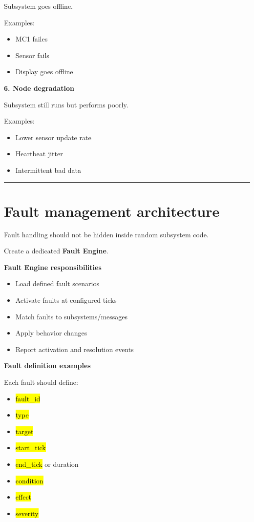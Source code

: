 \documentclass{report}
\begin{document}
Subsystem goes offline. 

Examples:
\begin{itemize}
   \item MC1 failes
   \item Sensor fails
   \item Display goes offline
\end{itemize}

\textbf{6. Node degradation}

Subsystem still runs but performs poorly. 

Examples:
\begin{itemize}
   \item Lower sensor update rate
   \item Heartbeat jitter
   \item Intermittent bad data
\end{itemize}


\begin{center}
\rule{0.9\textwidth}{1pt}
\end{center}
\section{Fault management architecture}

Fault handling should not be hidden inside random subsystem code. 

Create a dedicated \textbf{Fault Engine}. 

\textbf{Fault Engine responsibilities}
\begin{itemize}
   \item Load defined fault scenarios
   \item Activate faults at configured ticks
   \item Match faults to subsystems/messages
   \item Apply behavior changes
   \item Report activation and resolution events
\end{itemize}

\textbf{Fault definition examples}

Each fault should define:
\begin{itemize}
   \item \hl{fault\_id}
   \item \hl{type}
   \item \hl{target}
   \item \hl{start\_tick}
   \item \hl{end\_tick} or duration
   \item \hl{condition}
   \item \hl{effect}
   \item \hl{severity}
\end{itemize}
\end{document}
